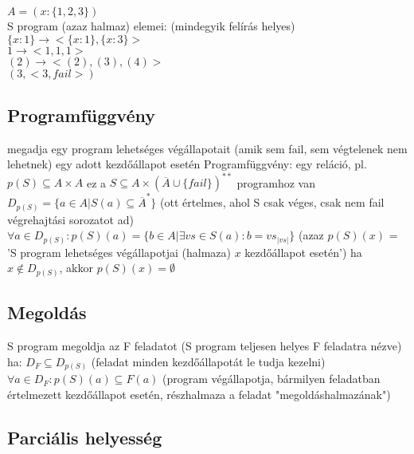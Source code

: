 \documentclass[12pt,a4paper]{article}
\begin{document}
$A=(x:\{1,2,3\})$ \\
S program (azaz halmaz) elemei: (mindegyik felírás helyes)\\
$\{x:1\} \to <\{x:1\}, \{x:3\}>$ \\
$1 \to <1,1,1>$ \\
$(2) \to <(2), (3), (4)>$ \\
$(3, <3, fail>)$

\subsection{Programfüggvény}

\begin{outline}
	\1 megadja egy program lehetséges végállapotait (amik sem fail, sem végtelenek nem lehetnek) egy adott kezdőállapot esetén
	\1 Programfüggvény: egy reláció, pl. $p(S) \subseteq A \times A$
		\2 ez a $S \subseteq A \times (\overline{A} \cup \{fail\})^{**}$ programhoz van
		\2 $D_{p(S)} = \{ a \in A | S(a) \subseteq \overline{A}^* \}$
		(ott értelmes, ahol S csak véges, csak nem fail végrehajtási sorozatot ad)
		\2 $\forall a \in D_{p(S)}: p(S)(a) = \{b \in A | \exists vs \in S(a): b=vs_{|vs|}\}$
		(azaz $p(S)(x)$ = 'S program lehetséges végállapotjai (halmaza) $x$ kezdőállapot esetén')
		\2 ha $x \notin D_{p(S)}$, akkor $p(S)(x) = \emptyset$
\end{outline}

\subsection{Megoldás}

\begin{outline}
	\1 S program megoldja az F feladatot (S program teljesen helyes F feladatra nézve) ha:
		\2 $D_F \subseteq D_{p(S)}$ (feladat minden kezdőállapotát le tudja kezelni)
		\2 $\forall a \in D_F : p(S)(a) \subseteq F(a)$
		(program végállapotja, bármilyen feladatban értelmezett kezdőállapot esetén,
		részhalmaza a feladat "megoldáshalmazának")
\end{outline}

\pagebreak

\subsection{Parciális helyesség}
\end{document}

